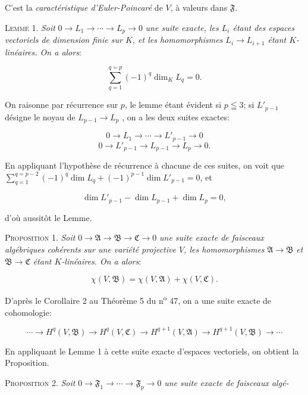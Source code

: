 C'est la \textit{caractéristique d'Euler-Poincaré} de $V$, à valeurs dans $\mathfrak{F}$.

\textsc{Lemme} 1. \textit{Soit} $0 \rightarrow L_1 \rightarrow \cdots \rightarrow L_p \rightarrow 0$ \textit{une suite exacte, les $L_i$ étant des espaces vectoriels de dimension finie sur $K$, et les homomorphismes $L_i \rightarrow L_{i+1}$ étant $K$-linéaires. On a alors}:

\begin{equation*}
\sum_{q=1}^{q=p} (-1)^q \dim_K L_q = 0.
\end{equation*}

On raisonne par récurrence sur $p$, le lemme étant évident si $p \leqq 3$; si $L'_{p-1}$ désigne le noyau de $L_{p-1} \rightarrow L_p$ , on a les deux suites exactes:

\begin{equation*}
0 \rightarrow L_1 \rightarrow \cdots \rightarrow L'_{p-1} \rightarrow 0
\end{equation*}
\begin{equation*}
0 \rightarrow L'_{p-1} \rightarrow L_{p-1} \rightarrow L_p \rightarrow 0.
\end{equation*}

En appliquant l'hypothèse de récurrence à chacune de ces suites, on voit que $\sum_{q=1}^{q=p-2} (-1)^q \dim L_q + (-1)^{p-1} \dim L'_{p-1} = 0$, et

\begin{equation*}
\dim L'_{p-1} - \dim L_{p-1} + \dim L_p = 0,
\end{equation*}

d'où aussitôt le Lemme.

\textsc{Proposition} 1. \textit{Soit} $0 \rightarrow \mathfrak{A} \rightarrow \mathfrak{B} \rightarrow \mathfrak{C} \rightarrow 0$ \textit{une suite exacte de faisceaux algébriques cohérents sur une variété projective $V$, les homomorphismes} $\mathfrak{A} \rightarrow \mathfrak{B}$ \textit{et} $\mathfrak{B} \rightarrow \mathfrak{C}$ \textit{étant $K$-linéaires. On a alors}:

\begin{equation*}
\chi(V, \mathfrak{B}) = \chi(V, \mathfrak{A}) + \chi(V, \mathfrak{C}).
\end{equation*}

D'après le Corollaire 2 au Théorème 5 du n\textsuperscript{o} 47, on a une suite exacte de cohomologie:

\begin{equation*}
\cdots \rightarrow H^q(V, \mathfrak{B}) \rightarrow H^q(V, \mathfrak{C}) \rightarrow H^{q+1}(V, \mathfrak{A}) \rightarrow H^{q+1}(V, \mathfrak{B}) \rightarrow \cdots
\end{equation*}

En appliquant le Lemme 1 à cette suite exacte d'espaces vectoriels, on obtient la Proposition.

\textsc{Proposition} 2. \textit{Soit} $0 \rightarrow \mathfrak{F}_1 \rightarrow \cdots \rightarrow \mathfrak{F}_p \rightarrow 0$ \textit{une suite exacte de faisceaux algé-}
